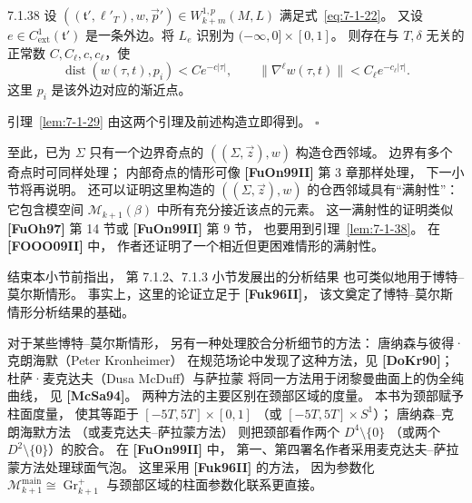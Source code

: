 \begin{lemma}{7.1.38}\label{lem:7-1-38}
设
$((\mathfrak t',\ell'_T),w,\vec p')
\in W_{k+m}^{1,p}(M,L)$
满足式~\eqref{eq:7-1-22}。
又设 $e\in C^1_{\mathrm{ext}}(\mathfrak t')$
是一条外边。将 $L_e$ 识别为
$(-\infty,0]\times[0,1]$。
则存在与 $T,\delta$ 无关的正常数
$C,C_\ell,c,c_\ell$，使
\[
\operatorname{dist}(w(\tau,t),p_i)
<Ce^{-c|\tau|},
\qquad
\|\nabla^\ell w(\tau,t)\|
<C_\ell e^{-c_\ell|\tau|}.
\]
这里 $p_i$ 是该外边对应的渐近点。
\end{lemma}

引理~\ref{lem:7-1-29}
由这两个引理及前述构造立即得到。
\hfill$\square$\par

至此，已为 $\Sigma$ 只有一个边界奇点的
$((\Sigma,\vec z),w)$ 构造仓西邻域。
边界有多个奇点时可同样处理；
内部奇点的情形可像 \textbf{[FuOn99II]} 第 3 章那样处理，
下一小节将再说明。
还可以证明这里构造的
$((\Sigma,\vec z),w)$ 的仓西邻域具有“满射性”：
它包含模空间
$\mathcal M_{k+1}(\beta)$ 中所有充分接近该点的元素。
这一满射性的证明类似
\textbf{[FuOh97]} 第 14 节或
\textbf{[FuOn99II]} 第 9 节，
也要用到引理~\ref{lem:7-1-38}。
在 \textbf{[FOOO09II]} 中，
作者还证明了一个相近但更困难情形的满射性。

结束本小节前指出，
第 7.1.2、7.1.3 小节发展出的分析结果
也可类似地用于博特--莫尔斯情形。
事实上，这里的论证立足于
\textbf{[Fuk96II]}，
该文奠定了博特--莫尔斯情形分析结果的基础。

对于某些博特--莫尔斯情形，
另有一种处理胶合分析细节的方法：
唐纳森与彼得·克朗海默（Peter Kronheimer）
在规范场论中发现了这种方法，见 \textbf{[DoKr90]}；
杜萨·麦克达夫（Dusa McDuff）与萨拉蒙
将同一方法用于闭黎曼曲面上的伪全纯曲线，
见 \textbf{[McSa94]}。
两种方法的主要区别在颈部区域的度量。
本书为颈部赋予柱面度量，
使其等距于 $[-5T,5T]\times[0,1]$
（或 $[-5T,5T]\times S^1$）；
唐纳森--克朗海默方法
（或麦克达夫--萨拉蒙方法）
则把颈部看作两个
$D^4\setminus\{0\}$
（或两个 $D^2\setminus\{0\}$）的胶合。
在 \textbf{[FuOn99II]} 中，
第一、第四署名作者采用麦克达夫--萨拉蒙方法处理球面气泡。
这里采用 \textbf{[Fuk96II]} 的方法，
因为参数化
$\mathcal M_{k+1}^{\mathrm{main}}\cong
\operatorname{Gr}_{k+1}^{+}$
与颈部区域的柱面参数化联系更直接。
